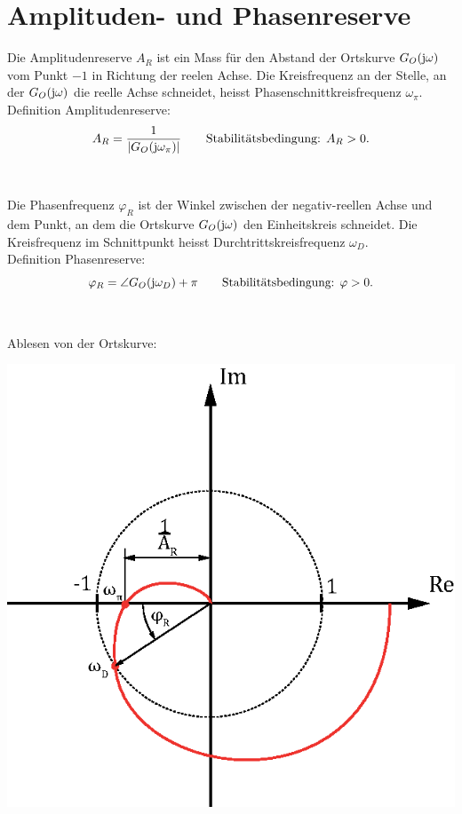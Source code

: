\section{Amplituden- und Phasenreserve}
Die Amplitudenreserve $A_R$ ist ein Mass für den Abstand der Ortskurve $G_O(\im\omega)$ vom Punkt $-1$ in Richtung der reelen Achse. Die Kreisfrequenz an der Stelle, an der $G_O(\im\omega)$ die reelle Achse schneidet, heisst Phasenschnittkreisfrequenz $\omega_\pi$.\\
Definition Amplitudenreserve:
\[
	A_R = \frac{1}{\left|G_O(\im\omega_\pi)\right|} \qquad \text{Stabilitätsbedingung: } A_R > 0.
\]\\\\
Die Phasenfrequenz $\varphi_R$ ist der Winkel zwischen der negativ-reellen Achse und dem Punkt, an dem die Ortskurve  $G_O(\im\omega)$ den Einheitskreis schneidet. Die Kreisfrequenz im Schnittpunkt heisst Durchtrittskreisfrequenz $\omega_D$.\\
Definition Phasenreserve:
\[
	\varphi_R = \angle{G_O(\im\omega_D)} + \pi \qquad \text{Stabilitätsbedingung: } \varphi > 0.
\]\\\\
Ablesen von der Ortskurve:
\begin{center}
	\includegraphics[scale=0.7]{images/ort_reserve.eps}
\end{center}
